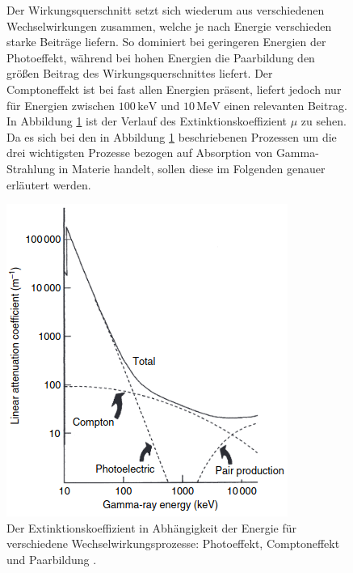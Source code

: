 \FloatBarrier
\begin{figure}[h]
\begin{minipage}[t]{0.48\textwidth}
\vspace{0pt}
Der Wirkungsquerschnitt setzt sich wiederum aus verschiedenen Wechselwirkungen zusammen, welche je nach Energie verschieden starke Beiträge liefern.
So dominiert bei geringeren Energien der Photoeffekt, während bei hohen Energien die Paarbildung den größen Beitrag des Wirkungsquerschnittes liefert.
Der Comptoneffekt ist bei fast allen Energien präsent, liefert jedoch nur für Energien zwischen $100\, \si{\keV}$ und $10\,\si{\MeV}$ einen relevanten Beitrag.
In Abbildung \ref{fig:tfig1} ist der Verlauf des Extinktionskoeffizient $\mu$ zu sehen.
Da es sich bei den in Abbildung \ref{fig:tfig1} beschriebenen Prozessen um die drei wichtigsten Prozesse bezogen auf Absorption von Gamma-Strahlung in Materie handelt, sollen diese im Folgenden genauer erläutert werden.
\end{minipage}
\hfill
\begin{minipage}[t]{0.50\textwidth}
\vspace{-10pt}
\centering
\includegraphics[width=\textwidth]{Absorption.png}
\caption{Der Extinktionskoeffizient in Abhängigkeit der Energie für verschiedene Wechselwirkungsprozesse: Photoeffekt, Comptoneffekt und Paarbildung \cite{quelle02}.}
\label{fig:tfig1}
\end{minipage}
\end{figure}
\FloatBarrier

